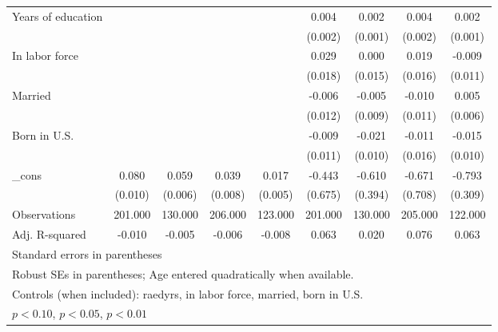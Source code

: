 \begin{table}[htbp]
\begin{tabular}{l*{8}{c}}
Years of education&                  &                  &                  &                  &    0.004\sym{*}  &    0.002         &    0.004\sym{**} &    0.002\sym{**} \\
          &                  &                  &                  &                  &  (0.002)         &  (0.001)         &  (0.002)         &  (0.001)         \\
In labor force&                  &                  &                  &                  &    0.029         &    0.000         &    0.019         &   -0.009         \\
          &                  &                  &                  &                  &  (0.018)         &  (0.015)         &  (0.016)         &  (0.011)         \\
Married   &                  &                  &                  &                  &   -0.006         &   -0.005         &   -0.010         &    0.005         \\
          &                  &                  &                  &                  &  (0.012)         &  (0.009)         &  (0.011)         &  (0.006)         \\
Born in U.S.&                  &                  &                  &                  &   -0.009         &   -0.021\sym{**} &   -0.011         &   -0.015         \\
          &                  &                  &                  &                  &  (0.011)         &  (0.010)         &  (0.016)         &  (0.010)         \\
\_cons    &    0.080\sym{***}&    0.059\sym{***}&    0.039\sym{***}&    0.017\sym{***}&   -0.443         &   -0.610         &   -0.671         &   -0.793\sym{**} \\
          &  (0.010)         &  (0.006)         &  (0.008)         &  (0.005)         &  (0.675)         &  (0.394)         &  (0.708)         &  (0.309)         \\
\midrule
Observations&  201.000         &  130.000         &  206.000         &  123.000         &  201.000         &  130.000         &  205.000         &  122.000         \\
Adj. R-squared&   -0.010         &   -0.005         &   -0.006         &   -0.008         &    0.063         &    0.020         &    0.076         &    0.063         \\
\bottomrule
\multicolumn{9}{l}{\footnotesize Standard errors in parentheses}\\
\multicolumn{9}{l}{\footnotesize Robust SEs in parentheses; Age entered quadratically when available.}\\
\multicolumn{9}{l}{\footnotesize Controls (when included): raedyrs, in labor force, married, born in U.S.}\\
\multicolumn{9}{l}{\footnotesize \sym{*} \(p<0.10\), \sym{**} \(p<0.05\), \sym{***} \(p<0.01\)}\\
\end{tabular}
\end{table}
